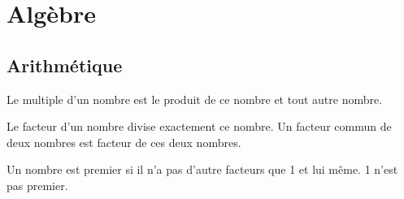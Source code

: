 \chapter{Algèbre}

\section{Arithmétique}

\begin{Definition}[Multiple]
    Le multiple d'un nombre est le produit de ce nombre et tout autre nombre.    
\end{Definition}

\begin{Definition}[Facteur]
    Le facteur d'un nombre divise exactement ce nombre.
    Un facteur commun de deux nombres est facteur de ces deux nombres.
\end{Definition}

\begin{Definition}[Premier]
    Un nombre est premier si il n'a pas d'autre facteurs que 1 et lui même.
    1 n'est pas premier.
\end{Definition}
